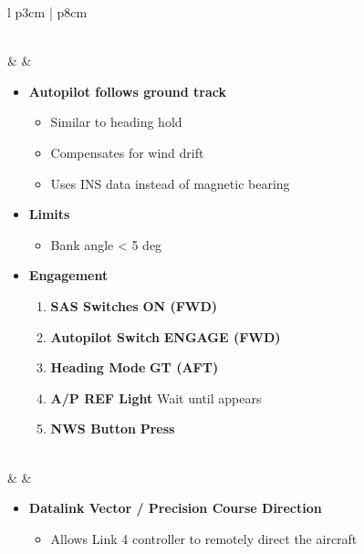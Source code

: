 \documentclass[8pt,usenames,dvipsnames,twoside]{article}
\begin{document}
\begin{center}
\begin{longtable}{l p{3cm} | p{8cm}}
\begin{minipage}[t]{\linewidth}
\begin{itemize}
\begin{enumerate}[label=(\alph*)]
						\end{enumerate} 
					\end{itemize}
				\end{minipage} \\
				\midrule 
				\textbullet &  & 
				\begin{minipage}[t]{\linewidth}
					\vspace{-7pt}
					\begin{itemize}
						\item \textbf{Autopilot follows ground track} 
						\begin{itemize}
							\item Similar to heading hold
							\item Compensates for wind drift
							\item Uses INS data instead of magnetic bearing
						\end{itemize}
						\item \textbf{Limits}
						\begin{itemize}
							\item Bank angle < 5 deg
						\end{itemize}
						\item \textbf{Engagement}
						\begin{enumerate}[label=(\alph*)]
							\item \textbf{SAS Switches} \dotfill \textbf{ON (FWD)}
							\item \textbf{Autopilot Switch} \dotfill \textbf{ENGAGE (FWD)}
							\item \textbf{Heading Mode} \dotfill \textbf{GT (AFT)}
							\item \textbf{A/P REF Light} \dotfill Wait until appears
							\item \textbf{NWS Button} \dotfill \textbf{Press}
						\end{enumerate} 
					\end{itemize}
				\end{minipage} \\
				\midrule 
				\textbullet &  & 
				\begin{minipage}[t]{\linewidth}
					\vspace{-7pt}
					\begin{itemize}
						\item \textbf{Datalink Vector / Precision Course Direction} 
						\begin{itemize}
							\item Allows Link 4 controller to remotely direct the aircraft

\end{itemize}
\end{itemize}
\end{minipage}
\end{longtable}
\end{center}
\end{document}
